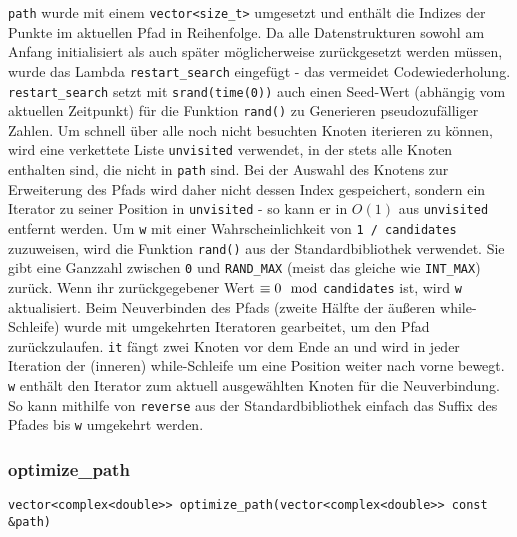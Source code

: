 \documentclass[a4paper, 10pt, ngerman]{article}
\begin{document}
\verb|path| wurde mit einem \verb|vector<size_t>| umgesetzt und enthält die Indizes der Punkte im aktuellen Pfad in Reihenfolge. Da alle Datenstrukturen sowohl am Anfang initialisiert als auch später möglicherweise zurückgesetzt werden müssen, wurde das Lambda \verb|restart_search| eingefügt - das vermeidet Codewiederholung. \verb|restart_search| setzt mit \verb|srand(time(0))| auch einen Seed-Wert (abhängig vom aktuellen Zeitpunkt) für die Funktion \verb|rand()| zu Generieren pseudozufälliger Zahlen. Um schnell über alle noch nicht besuchten Knoten iterieren zu können, wird eine verkettete Liste \verb|unvisited| verwendet, in der stets alle Knoten enthalten sind, die nicht in \verb|path| sind. Bei der Auswahl des Knotens zur Erweiterung des Pfads wird daher nicht dessen Index gespeichert, sondern ein Iterator zu seiner Position in \verb|unvisited| - so kann er in $O(1)$ aus \verb|unvisited| entfernt werden. Um \verb|w| mit einer Wahrscheinlichkeit von \verb|1 / candidates| zuzuweisen, wird die Funktion \verb|rand()| aus der Standardbibliothek verwendet. Sie gibt eine Ganzzahl zwischen \verb|0| und \verb|RAND_MAX| (meist das gleiche wie \verb|INT_MAX|) zurück. Wenn ihr zurückgegebener Wert $\equiv 0 \mod$\verb|candidates| ist, wird \verb|w| aktualisiert. Beim Neuverbinden des Pfads (zweite Hälfte der äußeren while-Schleife) wurde mit umgekehrten Iteratoren gearbeitet, um den Pfad zurückzulaufen. \verb|it| fängt zwei Knoten vor dem Ende an und wird in jeder Iteration der (inneren) while-Schleife um eine Position weiter nach vorne bewegt. \verb|w| enthält den Iterator zum aktuell ausgewählten Knoten für die Neuverbindung. So kann mithilfe von \verb|reverse| aus der Standardbibliothek einfach das Suffix des Pfades bis \verb|w| umgekehrt werden.

\subsubsection{optimize\_path}

\verb|vector<complex<double>> optimize_path(vector<complex<double>> const &path)|
\medskip
\end{document}
